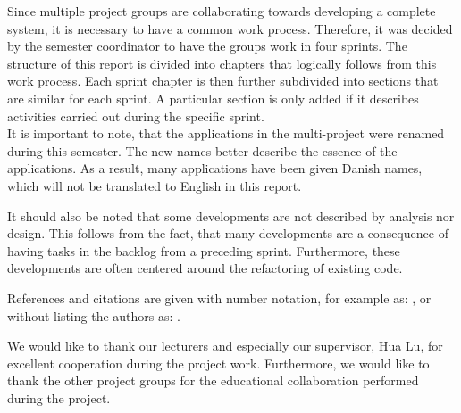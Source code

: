 Since multiple project groups are collaborating towards developing a complete system, it is necessary to have a common work process.
Therefore, it was decided by the semester coordinator to have the groups work in four sprints.
The structure of this report is divided into chapters that logically follows from this work process.
Each sprint chapter is then further subdivided into sections that are similar for each sprint.
A particular section is only added if it describes activities carried out during the specific sprint.\\

It is important to note, that the applications in the multi-project were renamed during this semester.
The new names better describe the essence of the applications.
As a result, many applications have been given Danish names, which will not be translated to English in this report.

It should also be noted that some developments are not described by analysis nor design.
This follows from the fact, that many developments are a consequence of having tasks in the backlog from a preceding sprint.
Furthermore, these developments are often centered around the refactoring of existing code.

References and citations are given with number notation, for example as: \citet{launcher2011}, or without listing the authors as: \cite{launcher2011}.

We would like to thank our lecturers and especially our supervisor, Hua Lu, for excellent cooperation during the project work.
Furthermore, we would like to thank the other project groups for the educational collaboration performed during the project.